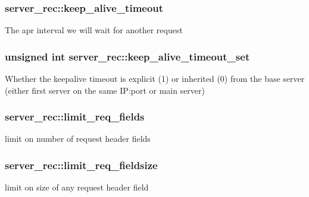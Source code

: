\subsubsection[{\texorpdfstring{keep\+\_\+alive\+\_\+timeout}{keep_alive_timeout}}]{ server\+\_\+rec\+::keep\+\_\+alive\+\_\+timeout}\hypertarget{structserver__rec_a62696ff217da3f6da55ae3415364da3d}{}\label{structserver__rec_a62696ff217da3f6da55ae3415364da3d}
The apr interval we will wait for another request 
\subsubsection[{\texorpdfstring{keep\+\_\+alive\+\_\+timeout\+\_\+set}{keep_alive_timeout_set}}]{\setlength{\rightskip}{0pt plus 5cm}unsigned {\bf int} server\+\_\+rec\+::keep\+\_\+alive\+\_\+timeout\+\_\+set}\hypertarget{structserver__rec_ad2b411cc66bcf99e7944d8f88fad9ac6}{}\label{structserver__rec_ad2b411cc66bcf99e7944d8f88fad9ac6}
Whether the keepalive timeout is explicit (1) or inherited (0) from the base server (either first server on the same IP\+:port or main server) 
\subsubsection[{\texorpdfstring{limit\+\_\+req\+\_\+fields}{limit_req_fields}}]{ server\+\_\+rec\+::limit\+\_\+req\+\_\+fields}\hypertarget{structserver__rec_a8488a7e27a3c634bf53c1e50513d002e}{}\label{structserver__rec_a8488a7e27a3c634bf53c1e50513d002e}
limit on number of request header fields 
\subsubsection[{\texorpdfstring{limit\+\_\+req\+\_\+fieldsize}{limit_req_fieldsize}}]{ server\+\_\+rec\+::limit\+\_\+req\+\_\+fieldsize}\hypertarget{structserver__rec_a81f271941b6f7c1adb696cbe878d4884}{}\label{structserver__rec_a81f271941b6f7c1adb696cbe878d4884}
limit on size of any request header field 
